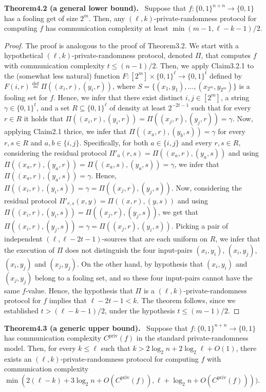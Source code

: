 \documentclass[10pt,a4paper]{article}
\newenvironment{authorclaim}[1]{\par\medskip\noindent\textbf{#1.}\ }{\par\medskip}
\begin{document}
\begin{authorclaim}{Theorem4.2 (a general lower bound)}
Suppose that $f:\{0,1\}^{n+n}\to\{0,1\}$ has a fooling get of size $2^m$. Then, any $(\ell,k)$-private-randomness protocol for computing $f$ has communication complexity at least $\min(m-1,\ell-k-1)/2$.
\end{authorclaim}

\begin{proof}
The proof is analogous to the proof of Theorem3.2. We start with a hypothetical $(\ell,k)$-private-randomness protocol, denoted $\Pi$, that computes $f$ with communication complexity $t\le(n-1)/2$. Then, we apply Claim3.2.1 to the (somewhat less natural) function $F:[2^m]\times\{0,1\}^\ell\to\{0,1\}^t$ defined by $F(i,r)\stackrel{\mathrm{def}}=\Pi((x_i,r),(y_i,r))$, where $S=\{(x_1,y_1),\ldots,(x_{2^m},y_{2^m})\}$ is a fooling set for $f$. Hence, we infer that there exist distinct $i,j\in[2^m]$, a string $\gamma\in\{0,1\}^t$, and a set $R\subseteq\{0,1\}^\ell$ of density at least $2^{-2t-1}$ such that for every $r\in R$ it holds that $\Pi((x_i,r),(y_i,r))=\Pi((x_j,r),(y_j,r))=\gamma$.
Now, applying Claim2.1 thrice, we infer that $\Pi((x_a,r),(y_b,s))=\gamma$ for every $r,s\in R$ and $a,b\in\{i,j\}$. Specifically, for both $a\in\{i,j\}$ and every $r,s\in R$, considering the residual protocol $\Pi'_a(r,s)=\Pi((x_a,r),(y_a,s))$ and using $\Pi((x_a,r),(y_a,r))=\Pi((x_a,s),(y_a,s))=\gamma$, we infer that $\Pi((x_a,r),(y_a,s))=\gamma$. Hence, $\Pi((x_i,r),(y_i,s))=\gamma=\Pi((x_j,r),(y_j,s))$. Now, considering the residual protocol $\Pi'_{r,s}(x,y)=\Pi((x,r),(y,s))$ and using $\Pi((x_i,r),(y_i,s))=\Pi((x_j,r),(y_j,s))$, we get that $\Pi((x_i,r),(y_j,s))=\gamma=\Pi((x_j,r),(y_i,s))$.
Picking a pair of independent $(\ell,\ell-2t-1)$-sources that are each uniform on $R$, we infer that the execution of $\Pi$ does not distinguish the four input-pairs $(x_i,y_i)$, $(x_i,y_j)$, $(x_i,y_j)$ and $(x_j,y_j)$. On the other hand, by hypothesis that $(x_i,y_i)$ and $(x_j,y_j)$ belong to a fooling set, and so these four input-pairs cannot have the same $f$-value. Hence, the hypothesis that $\Pi$ is a $(\ell,k)$-private-randomness protocol for $f$ implies that $\ell-2t-1<k$. The theorem follows, since we established $t>(\ell-k-1)/2$, under the hypothesis $t\le(m-1)/2$.
\end{proof}
\begin{authorclaim}{Theorem4.3 (a generic upper bound)}
Suppose that $f:\{0,1\}^{n+n}\to\{0,1\}$ has communication complexity $C^{\mathrm{priv}}(f)$ in the standard private-randomness model. Then, for every $k\le\ell$ such that $k>2\log_2n+2\log_2\ell+O(1)$, there exists an $(\ell,k)$-private-randomness protocol for computing $f$ with communication complexity $\min(2(\ell-k)+3\log_2n+O(C^{\mathrm{priv}}(f)),\ell+\log_2n+O(C^{\mathrm{priv}}(f))))$.
\end{authorclaim}
\end{document}
